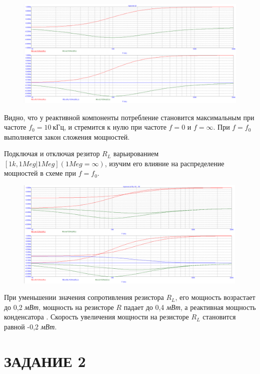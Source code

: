 \documentclass[a4paper, 12pt]{article}%
\begin{document}
\begin{enumerate}
\begin{figure}[h!]
\centering
\includegraphics[scale=0.4]{rcpower_AC1.png}
\label{fig:Image1}
\end{figure}

Видно, что у реактивной компоненты потребление становится максимальным при частоте $f_0 = 10 \: \textit{кГц}$, и стремится к нулю при частоте $f = 0$ и $f = \infty$. При $f = f_0$ выполняется закон сложения мощностей.

Подключая и отключая резитор $R_L$ варьированием $[1k, 1Meg \vert 1Meg] (1Meg = \infty)$, изучим его влияние на распределение мощностей в схеме при $f = f_0$.

\begin{figure}[h!]
\centering
\includegraphics[scale=0.4]{rcpower_AC2.png}
\label{fig:Image1}
\end{figure}

При уменьшении значения сопротивления резистора $R_L$, его мощность возрастает до 0,2 \textit{мВт}, мощность на резисторе $R$ падает до 0,4 \textit{мВт}, а реактивная мощность конденсатора . Скорость увеличения мощности на резисторе $R_L$ становится равной -0,2 \textit{мВт}.

\end{enumerate}

\section*{ЗАДАНИЕ 2}
\end{document}

